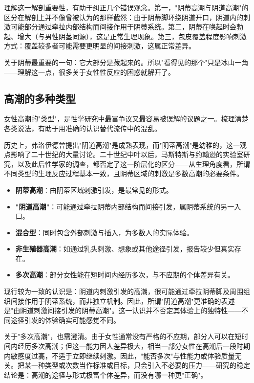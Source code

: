 \documentclass[12pt,UTF8]{ctexbook}
\newcommand{\keyword}[1]{\textbf{#1}}
\begin{document}
理解这一解剖重要性，有助于纠正几个错误观念。第一，"阴蒂高潮与阴道高潮"的区分在解剖上并不像曾被认为的那样截然：由于阴蒂脚环绕阴道开口，阴道内的刺激可能部分通过牵拉内部结构而间接作用于阴蒂系统。第二，阴蒂在唤起时会勃起、增大（与男性阴茎同源），这是正常生理现象。第三，包皮覆盖程度影响刺激方式：覆盖较多者可能需要更明显的间接刺激，这属正常差异。

\begin{tcolorbox}[colback=pink!5!white,colframe=red!50!black,title=贴心小叮咛]
关于阴蒂最重要的一句：它大部分是藏起来的。所以"看得见的那个"只是冰山一角——理解这一点，很多关于女性性反应的困惑就解开了。
\end{tcolorbox}
\subsection{高潮的多种类型}

女性高潮的"类型"，是性学研究中最富争议又最容易被误解的议题之一。梳理清楚各类说法，有助于用准确的认识替代流传中的混乱。

历史上，弗洛伊德曾提出"阴道高潮"是成熟表现，而"阴蒂高潮"是幼稚的，这一观点影响了二十世纪的大量讨论。二十世纪中叶以后，马斯特斯与约翰逊的实验室研究，以及此后性学家的调查，都否定了这一阶层化的区分——从生理角度看，所谓不同类型的生理反应过程基本一致，且阴蒂区域的刺激是多数高潮的必要条件。

\begin{itemize}
  \item \keyword{阴蒂高潮}：由阴蒂区域刺激引发，是最常见的形式。
  \item \keyword{"阴道高潮"}：可能通过牵拉阴蒂内部结构而间接引发，属阴蒂系统的另一入口。
  \item \keyword{混合型}：同时包含外部刺激与插入，为多数人的实际体验。
  \item \keyword{非生殖器高潮}：如通过乳头刺激、想象或其他途径引发，报告较少但真实存在。
  \item \keyword{多次高潮}：部分女性能在短时间内经历多次，与不应期的个体差异有关。
\end{itemize}

现行较为一致的认识是：阴道内刺激引发的高潮，很可能通过牵拉阴蒂脚及周围组织间接作用于阴蒂系统，而非独立机制。因此，所谓"阴道高潮"更准确的表述是"由阴道刺激间接引发的阴蒂高潮"。这一认识并不否定其体验上的独特性——不同途径引发的体验确实可能感觉不同。

关于"多次高潮"，也需澄清。由于女性通常没有严格的不应期，部分人可以在短时间内经历多次高潮；但这一能力因人差异极大，相当一部分女性在高潮后一段时期内敏感度过高，不适于立即继续刺激。因此，"能否多次"与性能力或体验质量无关。把某一种类型或次数当作标准或目标，只会引入不必要的压力——研究的稳定结论是：高潮的途径与形式极富个体差异，而没有哪一种更"正确"。
\end{document}
